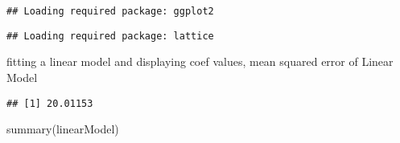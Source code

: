 \documentclass[
]{article}
\newenvironment{Shaded}{\begin{snugshade}}{\end{snugshade}}
\newcommand{\AttributeTok}[1]{\textcolor[rgb]{0.77,0.63,0.00}{#1}}
\newcommand{\DecValTok}[1]{\textcolor[rgb]{0.00,0.00,0.81}{#1}}
\newcommand{\FloatTok}[1]{\textcolor[rgb]{0.00,0.00,0.81}{#1}}
\newcommand{\FunctionTok}[1]{\textcolor[rgb]{0.00,0.00,0.00}{#1}}
\newcommand{\NormalTok}[1]{#1}
\newcommand{\OtherTok}[1]{\textcolor[rgb]{0.56,0.35,0.01}{#1}}
\newcommand{\SpecialCharTok}[1]{\textcolor[rgb]{0.00,0.00,0.00}{#1}}
\begin{document}
\begin{verbatim}
## Loading required package: ggplot2
\end{verbatim}

\begin{verbatim}
## Loading required package: lattice
\end{verbatim}

\begin{Shaded}
\end{Shaded}

fitting a linear model and displaying coef values, mean squared error of
Linear Model

\begin{Shaded}
\end{Shaded}

\begin{verbatim}
## [1] 20.01153
\end{verbatim}

\begin{Shaded}
\begin{Highlighting}[]
\FunctionTok{summary}\NormalTok{(linearModel)}
\end{Highlighting}
\end{Shaded}
\end{document}

